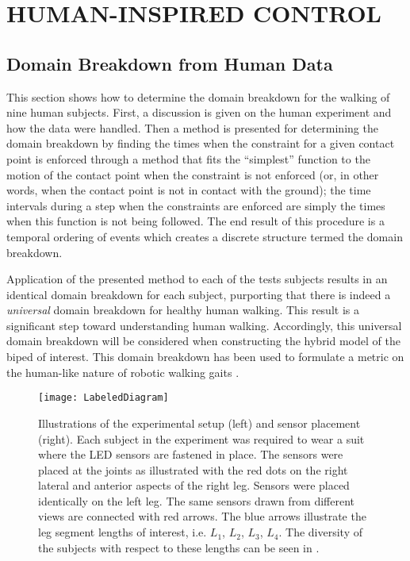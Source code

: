 \chapter{\uppercase{Human-Inspired Control}} \label{ch:hic}

\section{Domain Breakdown from Human Data} \label{sec:domainbreakdown}

This section shows how to determine the domain breakdown for the walking of nine
human subjects.
%
First, a discussion is given on the human experiment and how the data were
handled.
%
Then a method is presented for determining the domain breakdown by finding the
times when the constraint for a given contact point is enforced through a method
that fits the ``simplest'' function to the motion of the contact point when the
constraint is not enforced (or, in other words, when the contact point is not in
contact with the ground);
%
the time intervals during a step when the constraints are enforced are simply
the times when this function is not being followed.
%
The end result of this procedure is a temporal ordering of events which creates
a discrete structure termed the domain breakdown.

Application of the presented method to each of the tests subjects results in an
identical domain breakdown for each subject, purporting that there is indeed a
{\em universal} domain breakdown for healthy human walking.
%
This result is a significant step toward understanding human walking.
%
Accordingly, this universal domain breakdown will be considered when
constructing the hybrid model of the biped of interest.
%
This domain breakdown has been used to formulate a metric on the human-like
nature of robotic walking gaits \cite{Ames2011,Vasudevan2013}.

\begin{figure}[t!]
  \centering
  \texttt{[image: LabeledDiagram]}
  \caption[Illustrations of the experimental setup and sensor
  placement.]{Illustrations of the experimental setup (left) and sensor
    placement (right).
    Each subject in the experiment was required to wear a suit where the LED
    sensors are fastened in place.
    The sensors were placed at the joints as illustrated with the red dots on
    the right lateral and anterior aspects of the right leg.
    Sensors were placed identically on the left leg.
    The same sensors drawn from different views are connected with red arrows.
    The blue arrows illustrate the leg segment lengths of interest, i.e. $L_1$,
    $L_2$, $L_3$, $L_4$.
    The diversity of the subjects with respect to these lengths can be seen in
    .}
  \label{fig:Sensors}
\end{figure}


